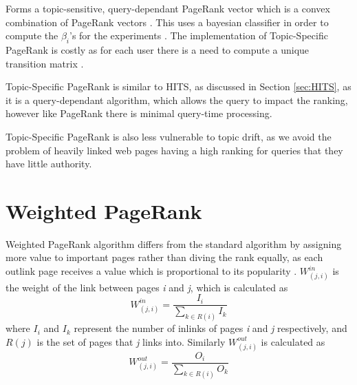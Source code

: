 \documentclass[11pt]{report}
\begin{document}
Forms a topic-sensitive, query-dependant PageRank vector which is a convex combination of PageRank vectors \cite{langville}. This uses a bayesian classifier in order to compute the $\beta_i$'s for the experiments \cite{langville}.   The implementation of Topic-Specific PageRank is costly as for each user there is a need to compute a unique transition matrix \cite{manning}. 

Topic-Specific PageRank is similar to HITS, as discussed in Section \ref{sec:HITS}, as it is a query-dependant algorithm, which allows the query to impact the ranking, however like PageRank there is minimal query-time processing. 

Topic-Specific PageRank is also less vulnerable to topic drift, as we avoid the problem of heavily linked web pages having a high ranking for queries that they have little authority. 

\section{Weighted PageRank}\label{sec:weighted}

Weighted PageRank algorithm differs from the standard algorithm by assigning more value to important pages rather than diving the rank equally, as each outlink page receives a value which is proportional to its popularity \cite{xing2004weighted}. $W^{in}_{(j,i)}$ is the weight of the link between pages \textit{i} and \textit{j}, which is calculated as 
\begin{equation}\label{eq:weightin}
W^{in}_{(j,i)} = \frac{I_i}{\sum_{k\in R(i)}I_k}
\end{equation}
where $I_i$ and $I_k$ represent the number of inlinks of pages \textit{i} and \textit{j} respectively, and $R(j)$ is the set of pages that \textit{j} links into. 
Similarly $W^{out}_{(j,i)}$ is calculated as
\begin{equation}\label{eq:weightout}
W^{out}_{(j,i)} = \frac{O_i}{\sum_{k\in R(i)}O_k}
\end{equation}
\end{document}
